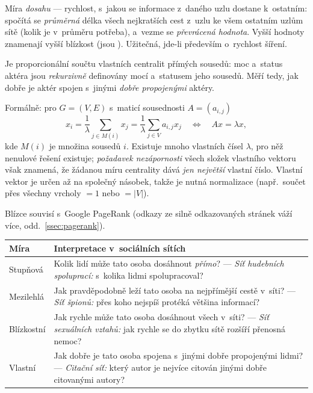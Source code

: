 \documentclass[11pt,a4paper]{article}
\theoremstyle{definition}
\begin{document}
\begin{defbox}
Míra \emph{dosahu} --- rychlost, s~jakou se informace z~daného uzlu dostane k~ostatním:
spočítá se \emph{průměrná} délka všech nejkratších cest z~uzlu ke všem ostatním uzlům sítě
(kolik  je v~průměru potřeba), a~vezme se \emph{převrácená hodnota}. Vyšší hodnoty
znamenají vyšší blízkost (jsou ). Užitečná, jde-li především o~rychlost šíření.
\end{defbox}

\begin{defbox}
Je proporcionální součtu vlastních centralit přímých sousedů: moc a~status aktéra jsou
\emph{rekurzivně} definovány mocí a~statusem jeho sousedů. Měří tedy, jak dobře je aktér spojen
s~jinými \emph{dobře propojenými} aktéry.

Formálně: pro $G=(V,E)$ s~maticí sousednosti $A=(a_{i,j})$
\[ x_i=\frac1\lambda\sum_{j\in M(i)}x_j=\frac1\lambda\sum_{j\in V}a_{i,j}x_j
   \quad\Longleftrightarrow\quad Ax=\lambda x, \]
kde $M(i)$ je množina sousedů $i$. Existuje mnoho vlastních čísel $\lambda$, pro něž
nenulové řešení existuje; \emph{požadavek nezápornosti} všech složek vlastního vektoru však
znamená, že žádanou míru centrality dává \emph{jen největší} vlastní číslo. Vlastní vektor je
určen až na společný násobek, takže je nutná normalizace (např.\ součet přes všechny vrcholy
$=1$ nebo $=|V|$).

Blízce souvisí s~Google PageRank (odkazy ze silně odkazovaných stránek váží více,
odd.~\ref{ssec:pagerank}).
\end{defbox}

\begin{center}
\small
\begin{tabular}{@{}p{2.7cm}p{12.6cm}@{}}
\toprule
\textbf{Míra} & \textbf{Interpretace v~sociálních sítích} \\
\midrule
Stupňová & Kolik lidí může tato osoba dosáhnout \emph{přímo}? --- \emph{Síť hudebních
  spoluprací:} s~kolika lidmi spolupracoval? \\
Mezilehlá & Jak pravděpodobně leží tato osoba na nejpřímější cestě v~síti? --- \emph{Síť
  špionů:} přes koho nejspíš protéká většina informací? \\
Blízkostní & Jak rychle může tato osoba dosáhnout všech v~síti? --- \emph{Síť sexuálních
  vztahů:} jak rychle se do zbytku sítě rozšíří přenosná nemoc? \\
Vlastní & Jak dobře je tato osoba spojena s~jinými dobře propojenými lidmi? --- \emph{Citační
  síť:} který autor je nejvíce citován jinými dobře citovanými autory? \\
\bottomrule
\end{tabular}
\end{center}
\end{document}
